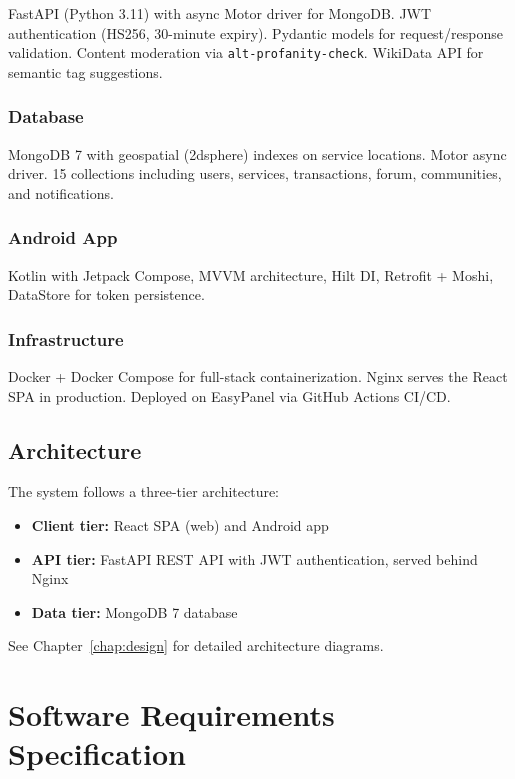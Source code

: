 \documentclass[10pt,a4paper]{report}
\begin{document}
FastAPI (Python 3.11) with async Motor driver for MongoDB. JWT authentication (HS256, 30-minute expiry). Pydantic models for request/response validation. Content moderation via \texttt{alt-profanity-check}. WikiData API for semantic tag suggestions.

\subsection{Database}

MongoDB 7 with geospatial (2dsphere) indexes on service locations. Motor async driver. 15 collections including users, services, transactions, forum, communities, and notifications.

\subsection{Android App}

Kotlin with Jetpack Compose, MVVM architecture, Hilt DI, Retrofit + Moshi, DataStore for token persistence.

\subsection{Infrastructure}

Docker + Docker Compose for full-stack containerization. Nginx serves the React SPA in production. Deployed on EasyPanel via GitHub Actions CI/CD.

\section{Architecture}

The system follows a three-tier architecture:
\begin{itemize}
    \item \textbf{Client tier:} React SPA (web) and Android app
    \item \textbf{API tier:} FastAPI REST API with JWT authentication, served behind Nginx
    \item \textbf{Data tier:} MongoDB 7 database
\end{itemize}

See Chapter~\ref{chap:design} for detailed architecture diagrams.

\chapter{Software Requirements Specification}
\end{document}
